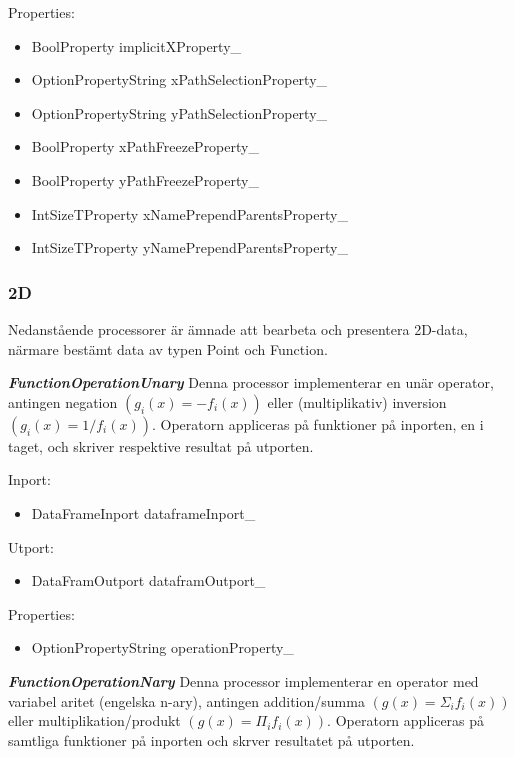 Properties:
    \begin{itemize}
    \setlength\itemsep{0em}
    \item BoolProperty implicitXProperty\_
    \item OptionPropertyString xPathSelectionProperty\_
    \item OptionPropertyString yPathSelectionProperty\_
    \item BoolProperty xPathFreezeProperty\_
    \item BoolProperty yPathFreezeProperty\_
    \item IntSizeTProperty xNamePrependParentsProperty\_
    \item IntSizeTProperty yNamePrependParentsProperty\_
\end{itemize}

\subsubsection{2D}
\label{ch:2d-processorer}
Nedanstående processorer är ämnade att bearbeta och presentera 2D-data, närmare bestämt data av typen Point och Function.

\textbf{\textit{FunctionOperationUnary}}\newline
Denna processor implementerar en unär operator, antingen negation $(g_{i}(x) = -f_{i}(x))$ eller (multiplikativ) inversion $(g_{i}(x) = 1/f_{i}(x))$. Operatorn appliceras på funktioner på inporten, en i taget, och skriver respektive resultat på utporten.

Inport:
\begin{itemize}
\item DataFrameInport dataframeInport\_
\end{itemize}

Utport:
\begin{itemize}
\item DataFramOutport dataframOutport\_
\end{itemize}

Properties:
\begin{itemize}
\item OptionPropertyString operationProperty\_
\end{itemize}

\textbf{\textit{FunctionOperationNary}}\newline
Denna processor implementerar en operator med variabel aritet (engelska n-ary), antingen addition/summa $(g(x) = \Sigma_{i}f_{i}(x))$ eller multiplikation/produkt $(g(x) = \Pi_{i}f_{i}(x))$. Operatorn appliceras på samtliga funktioner på inporten och skrver resultatet på utporten.

